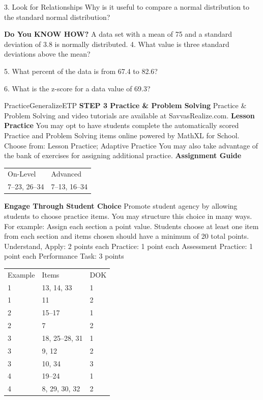 \documentclass{article}
\newenvironment{item-analysis}{}{}      %
\newenvironment{concept-summary}{}{}    %
\newenvironment{te-addendum}[2]{}{}     %
\newcommand{\answer}[1]{}               %
\newcommand{\te}[1]{}                   %
\begin{document}
\begin{concept-summary}
3. Look for Relationships Why is it useful to compare a normal distribution to the standard normal distribution?
\answer{You can use your calculator or a spreadsheet to find the area under the curve to the left of any z-score in the standard normal distribution, but it is much more complicated to find the area under the curve to the left of a data value in a general normal distribution.}
\textbf{Do You KNOW HOW?}
A data set with a mean of 75 and a standard deviation of 3.8 is normally distributed.
4. What value is three standard deviations above the mean?
\answer{86.4}
5. What percent of the data is from 67.4 to 82.6?
\answer{95\%}
6. What is the z-score for a data value of 69.3?
\answer{−1.5}
\end{concept-summary}
\begin{te-addendum}{Practice}{GeneralizeETP}
\textbf{STEP 3 Practice & Problem Solving}
Practice \& Problem Solving and video tutorials are available at SavvasRealize.com.
\textbf{Lesson Practice} You may opt to have students complete the automatically scored Practice and Problem Solving items online powered by MathXL for School.
Choose from: Lesson Practice; Adaptive Practice
You may also take advantage of the bank of exercises for assigning additional practice.
\textbf{Assignment Guide}
\begin{tabular}{ll}
On-Level & Advanced \\
7–23, 26–34 & 7–13, 16–34 \\
\end{tabular}
\textbf{Engage Through Student Choice}
Promote student agency by allowing students to choose practice items. You may structure this choice in many ways. For example:
Assign each section a point value. Students choose at least one item from each section and items chosen should have a minimum of 20 total points.
Understand, Apply: 2 points each
Practice: 1 point each
Assessment Practice: 1 point each
Performance Task: 3 points
\te{Scan the QR code to access a video tutorial.}
\end{te-addendum}
\begin{item-analysis}
\begin{tabular}{lll}
Example & Items & DOK \\
1 & 13, 14, 33 & 1 \\
1 & 11 & 2 \\
2 & 15--17 & 1 \\
2 & 7 & 2 \\
3 & 18, 25--28, 31 & 1 \\
3 & 9, 12 & 2 \\
3 & 10, 34 & 3 \\
4 & 19--24 & 1 \\
4 & 8, 29, 30, 32 & 2 \\
\end{tabular}
\end{item-analysis}
\end{document}

